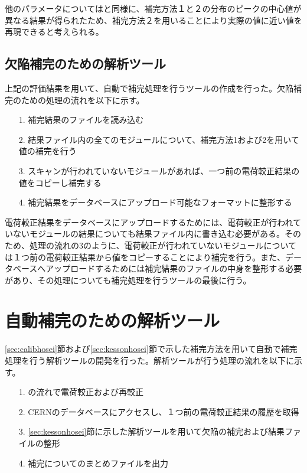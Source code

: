 他のパラメータについてはと同様に、補完方法１と２の分布のピークの中心値が異なる結果が得られたため、補完方法２を用いることにより実際の値に近い値を再現できると考えられる。

\subsection{欠陥補完のための解析ツール}
上記の評価結果を用いて、自動で補完処理を行うツールの作成を行った。欠陥補完のための処理の流れを以下に示す。
\begin{itemize}
  \item[1. ] 補完結果のファイルを読み込む
  \item[2. ] 結果ファイル内の全てのモジュールについて、補完方法1および2を用いて値の補完を行う
  \item[3. ] スキャンが行われていないモジュールがあれば、一つ前の電荷較正結果の値をコピーし補完する
  \item[4. ] 補完結果をデータベースにアップロード可能なフォーマットに整形する
\end{itemize}

電荷較正結果をデータベースにアップロードするためには、電荷較正が行われていないモジュールの結果についても結果ファイル内に書き込む必要がある。そのため、処理の流れの3のように、電荷較正が行われていないモジュールについては１つ前の電荷較正結果から値をコピーすることにより補完を行う。また、データベースへアップロードするためには補完結果のファイルの中身を整形する必要があり、その処理についても補完処理を行うツールの最後に行う。

\section{自動補完のための解析ツール}
\label{sec:kaisekitool}
\ref{sec:calibhosei}節および\ref{sec:kessonhosei}節で示した補完方法を用いて自動で補完処理を行う解析ツールの開発を行った。解析ツールが行う処理の流れを以下に示す。

\begin{itemize}
  \item[1. ] の流れで電荷較正および再較正
  \item[2. ] CERNのデータベースにアクセスし、１つ前の電荷較正結果の履歴を取得
  \item[3. ] \ref{sec:kessonhosei}節に示した解析ツールを用いて欠陥の補完および結果ファイルの整形
  \item[4. ] 補完についてのまとめファイルを出力
\end{itemize}

